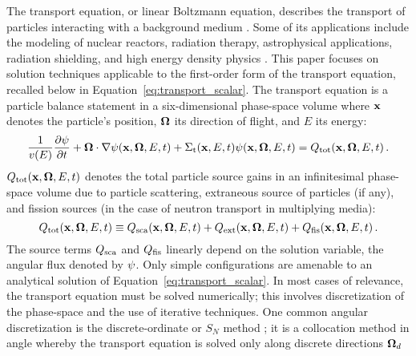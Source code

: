
The transport equation, or linear Boltzmann equation, describes the
transport of particles interacting with a background medium \cite{glasstone}.  Some
of its applications include the modeling of nuclear reactors, radiation
therapy, astrophysical applications, radiation shielding, and high energy density physics
\cite{glasstone,radiotherapy,astrophysics_textbook,lewis,laser_plasmas}.
This paper focuses on solution techniques applicable to the first-order
form of the transport equation, recalled below in Equation~\eqref{eq:transport_scalar}. The
transport equation is a particle balance statement in a six-dimensional phase-space volume
where $\mathbf{x}$ denotes the particle's position, $\mathbf{\Omega}$ its direction of flight, and $E$ its energy:
\begin{equation}\label{eq:transport_scalar}
  \frac{1}{v(E)}\frac{\partial \psi}{\partial t} + \mathbf{\Omega}\cdot\nabla\psi(\mathbf{x},\mathbf{\Omega},E,t)
    + \Sigma_\textup{t}(\mathbf{x},E,t)\psi(\mathbf{x},\mathbf{\Omega},E,t) = Q_\textup{tot}(\mathbf{x},\mathbf{\Omega},E,t)
  \,.
\end{equation}
$Q_\textup{tot}(\mathbf{x},\mathbf{\Omega},E,t)$ denotes the total particle source gains in an infinitesimal phase-space volume
due to particle scattering, extraneous source of particles (if any), and
fission sources (in the case of neutron transport in multiplying media):
\begin{equation}
  Q_\textup{tot}(\mathbf{x},\mathbf{\Omega},E,t) \equiv Q_\textup{sca}(\mathbf{x},\mathbf{\Omega},E,t) + Q_\textup{ext}(\mathbf{x},\mathbf{\Omega},E,t) + Q_\textup{fis}(\mathbf{x},\mathbf{\Omega},E,t)
  \,.
\end{equation}
The source terms $Q_\textup{sca}$ and $Q_\textup{fis}$ linearly depend on the solution variable, the angular flux denoted by $\psi$. Only simple configurations are amenable to an analytical solution of Equation~\eqref{eq:transport_scalar}.
In most cases of relevance, the transport equation must be solved numerically; this involves discretization
of the phase-space and the use of iterative techniques.
One common angular discretization is the discrete-ordinate or $S_N$ method
\cite{glasstone,lewis,duderstadt}; it is a collocation method in angle whereby the transport equation is solved only along discrete directions $\mathbf{\Omega}_d$
